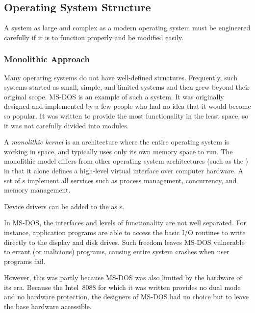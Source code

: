 \subsection{Operating System Structure}\label{subsec:OS_Structure}
A system as large and complex as a modern operating system must be engineered carefully if it is to function properly and be modified easily.

\subsubsection{Monolithic Approach}\label{subsubsec:Monolithic_Approach}
Many operating systems do not have well-defined structures.
Frequently, such systems started as small, simple, and limited systems and then grew beyond their original scope.
MS-DOS is an example of such a system.
It was originally designed and implemented by a few people who had no idea that it would become so popular.
It was written to provide the most functionality in the least space, so it was not carefully divided into modules.

\begin{definition}\label{def:Monolithic_Kernel}
  A \emph{monolithic kernel} is an  architecture where the entire operating system is working in  space, and typically uses only its own memory space to run.
  The monolithic model differs from other operating system architectures (such as the ) in that it alone defines a high-level virtual interface over computer hardware.
  A set of s implement all  services such as process management, concurrency, and memory management.

  Device drivers can be added to the  as s.
\end{definition}

In MS-DOS, the interfaces and levels of functionality are not well separated.
For instance, application programs are able to access the basic I/O routines to write directly to the display and disk drives.
Such freedom leaves MS-DOS vulnerable to errant (or malicious) programs, causing entire system crashes when user programs fail.

However, this was partly because MS-DOS was also limited by the hardware of its era.
Because the Intel~8088 for which it was written provides no dual mode and no hardware protection, the designers of MS-DOS had no choice but to leave the base hardware accessible.

